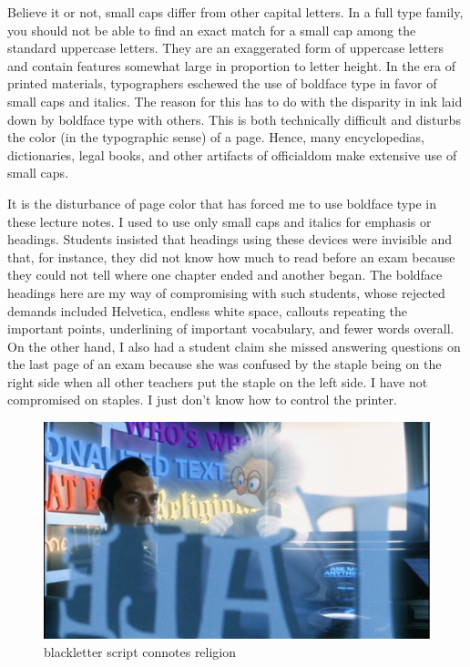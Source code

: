 Believe it or not, small caps differ from other capital letters. In a
full type family, you should not be able to find an exact match for a
small cap among the standard uppercase letters. They are an exaggerated
form of uppercase letters and contain features somewhat large in
proportion to letter height. In the era of printed materials,
typographers eschewed the use of boldface type in favor of small caps
and italics. The reason for this has to do with the disparity in ink
laid down by boldface type with others. This is both technically
difficult and disturbs the color (in the typographic sense) of a page.
Hence, many encyclopedias, dictionaries, legal books, and other
artifacts of officialdom make extensive use of small caps.

It is the disturbance of page color that has forced me to use boldface
type in these lecture notes. I used to use only small caps and italics
for emphasis or headings. Students insisted that headings using these
devices were invisible and that, for instance, they did not know how
much to read before an exam because they could not tell where one
chapter ended and another began. The boldface headings here are my way
of compromising with such students, whose rejected demands included
Helvetica, endless white space, callouts repeating the important points,
underlining of important vocabulary, and fewer words overall. On the
other hand, I also had a student claim she missed answering questions on
the last page of an exam because she was confused by the staple being on
the right side when all other teachers put the staple on the left side.
I have not compromised on staples. I just don't know how to control the
printer.

\begin{figure}
\centering
\includegraphics{./fiDrKnowMenu4.pdf}
\caption{blackletter script connotes religion}
\end{figure}

